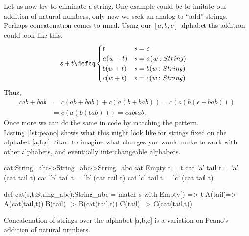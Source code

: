 Let us now try to eliminate a string.  One example could be to imitate 
our addition of natural numbers, only now we seek an analog to ``add''
strings.  Perhaps concatenation comes to mind.  Using our $[a,b,c]$ 
alphabet ths addition could look like this.
\begin{align*}
    s+t & \defeq \begin{cases}
        t & s=\epsilon\\
        a(w+t) & s= a(w:String)\\
        b(w+t) & s= b(w:String)\\
        c(w+t) & s= c(w:String)\\
    \end{cases}
\end{align*}
Thus,
\begin{align*}
    cab+bab & = c(ab+bab)+c(a(b+bab))=c(a(b(\epsilon+bab)))\\
        & = c(a(b(bab)))=cabbab.
\end{align*}
Once more we can do the same in code by matching the pattern.
Listing~\ref{lst:peano} shows what this might look like for 
strings fixed on the alphabet [a,b,c].  Start to imagine what 
changes you would make to work with other alphabets, and 
eventually interchangeable alphabets.
\begin{lstfloat}
\begin{center}
\begin{Fcode}[]
cat:String_abc->String_abc->String_abc
cat Empty t   = t
cat 'a' tail t = 'a' (cat tail t)
cat 'b' tail t = 'b' (cat tail t)
cat 'c' tail t = 'c' (cat tail t)
\end{Fcode}
\begin{Pcode}[]
def cat(s,t:String_abc):String_abc =
  match s with 
    Empty() => t
    A(tail)=> A(cat(tail,t))
    B(tail)=> B(cat(tail,t))
    C(tail)=> C(cat(tail,t))
\end{Pcode}
\end{center}
\caption{Concatenation of strings over the alphabet [a,b,c] is a variation on 
Peano's addition of natural numbers.}
\label{lst:peano-elim}
\end{lstfloat}
    
